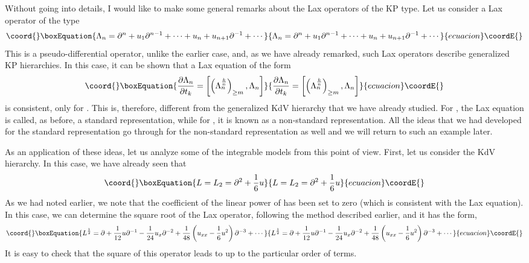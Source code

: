 \documentclass[a4paper,11pt]{article}
\begin{document}
Without going into details, I would like to make some general remarks
about the Lax operators of the KP type. Let us consider a Lax operator
of the type
\begin{equation}\coord{}\boxEquation{
\Lambda_{n} = \partial^{n} + u_{1} \partial^{n-1} + \cdots + u_{n} +
u_{n+1} \partial^{-1} + \cdots
}{
\Lambda_{n} = \partial^{n} + u_{1} \partial^{n-1} + \cdots + u_{n} +
u_{n+1} \partial^{-1} + \cdots
}{ecuacion}\coordE{}\end{equation}
This is a pseudo-differential operator, unlike the earlier case, and,
as we have already remarked, such Lax operators describe generalized
KP hierarchies. In this case, it can be shown that a Lax equation of the form
\begin{equation}\coord{}\boxEquation{
{\partial \Lambda_{n}\over \partial t_{k}} =
\left[\left(\Lambda_{n}^{k\over n}\right)_{\geq m} ,
\Lambda_{n}\right]
}{
{\partial \Lambda_{n}\over \partial t_{k}} =
\left[\left(\Lambda_{n}^{k\over n}\right)_{\geq m} ,
\Lambda_{n}\right]
}{ecuacion}\coordE{}\end{equation}
is consistent, only for \coordHE{}. This is, therefore, different from
the generalized KdV hierarchy that we have already studied. For \coordHE{}, the Lax equation is called, as before, a standard representation,
while for \coordHE{}, it is known as a non-standard representation. All
the ideas that we had developed for the standard representation go
through for the non-standard representation as well and we will return
to such an example later.


As an application of these ideas, let us analyze some of the
integrable models from this point of view. First, let us consider the
KdV hierarchy. In this case, we have already seen that
\begin{equation}\coord{}\boxEquation{
L = L_{2} = \partial^{2} + {1\over 6} u
}{
L = L_{2} = \partial^{2} + {1\over 6} u
}{ecuacion}\coordE{}\end{equation}
As we had noted earlier, we note that the coefficient of the linear
power of \myHighlight{$\partial$}\coordHE{} has been set to zero (which is consistent with the
Lax equation). In this case, we can determine the square root of the
Lax operator, following the method described earlier, and it has the
form,
\begin{equation}\coord{}\boxEquation{
L^{1\over 2} = \partial + {1\over 12} u \partial^{-1} - {1\over 24}
u_{x} \partial^{-2} + {1\over 48} \left(u_{xx} - {1\over 6}
u^{2}\right) \partial^{-3} + \cdots
}{
L^{1\over 2} = \partial + {1\over 12} u \partial^{-1} - {1\over 24}
u_{x} \partial^{-2} + {1\over 48} \left(u_{xx} - {1\over 6}
u^{2}\right) \partial^{-3} + \cdots
}{ecuacion}\coordE{}\end{equation}
It is easy to check that the square of this operator leads to \coordHE{} up
to the particular order of terms.
\end{document}
